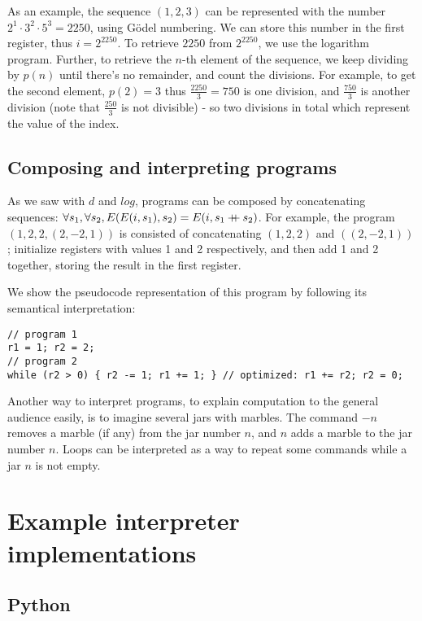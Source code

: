 \documentclass{article}
\newcommand\doubleplus{\mathbin{{+}\mspace{-8mu}{+}}}
\begin{document}
As an example, the sequence $(1, 2, 3)$ can be represented with the number $2^1 \cdot 3^2 \cdot 5^3 = 2250$, using Gödel numbering. We can store this number in the first register, thus $i = 2^{2250}$. To retrieve $2250$ from $2^{2250}$, we use the logarithm program. Further, to retrieve the $n$-th element of the sequence, we keep dividing by $p(n)$ until there's no remainder, and count the divisions. For example, to get the second element, $p(2) = 3$ thus $\frac{2250}{3} = 750$ is one division, and $\frac{750}{3}$ is another division (note that $\frac{250}{3}$ is not divisible) - so two divisions in total which represent the value of the index.

\subsection{Composing and interpreting programs}

As we saw with $d$ and $log$, programs can be composed by concatenating sequences: $\forall s_1, \forall s_2, E(E(i, s_1), s_2) = E(i, s_1 \doubleplus s_2)$. For example, the program $(1, 2, 2, (2, -2, 1))$ is consisted of concatenating $(1, 2, 2)$ and $((2, -2, 1))$; initialize registers with values 1 and 2 respectively, and then add 1 and 2 together, storing the result in the first register.

We show the pseudocode representation of this program by following its semantical interpretation:

\begin{verbatim}
// program 1
r1 = 1; r2 = 2;
// program 2
while (r2 > 0) { r2 -= 1; r1 += 1; } // optimized: r1 += r2; r2 = 0;
\end{verbatim}

Another way to interpret programs, to explain computation to the general audience easily, is to imagine several jars with marbles. The command $-n$ removes a marble (if any) from the jar number $n$, and $n$ adds a marble to the jar number $n$. Loops can be interpreted as a way to repeat some commands while a jar $n$ is not empty.

\section{Example interpreter implementations}

\subsection{Python}
\end{document}
